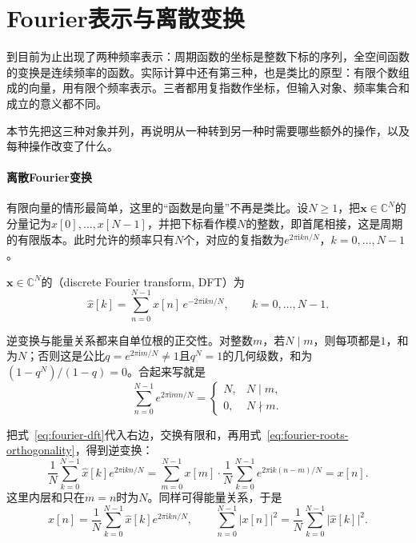 \section{Fourier表示与离散变换}
\label{sec:fourier-discrete}

到目前为止出现了两种频率表示：周期函数的坐标是整数下标的序列，全空间函数的变换是连续频率的函数。实际计算中还有第三种，也是类比的原型：有限个数组成的向量，用有限个频率表示。三者都用复指数作坐标，但输入对象、频率集合和成立的意义都不同。

本节先把这三种对象并列，再说明从一种转到另一种时需要哪些额外的操作，以及每种操作改变了什么。

\paragraph{离散Fourier变换}

有限向量的情形最简单，这里的“函数是向量”不再是类比。设$N\geq1$，把$\bm x\in\mathbb C^N$的分量记为$x[0],\ldots,x[N-1]$，并把下标看作模$N$的整数，即首尾相接，这是周期的有限版本。此时允许的频率只有$N$个，对应的复指数为$e^{2\pi\mathrm ikn/N}$，$k=0,\ldots,N-1$。

\begin{definition}[离散Fourier变换]
\label{def:fourier-dft}
$\bm x\in\mathbb C^N$的（discrete Fourier transform, DFT）为
\begin{equation}
\widehat x[k]=\sum_{n=0}^{N-1}x[n]\,e^{-2\pi\mathrm ikn/N},\qquad k=0,\ldots,N-1 .
\label{eq:fourier-dft}
\end{equation}
\end{definition}

逆变换与能量关系都来自单位根的正交性。对整数$m$，若$N\mid m$，则每项都是$1$，和为$N$；否则这是公比$q=e^{2\pi\mathrm im/N}\neq1$且$q^N=1$的几何级数，和为$(1-q^N)/(1-q)=0$。合起来写就是
\begin{equation}
\sum_{n=0}^{N-1}e^{2\pi\mathrm imn/N}=\begin{cases}N,&N\mid m,\\0,&N\nmid m.\end{cases}
\label{eq:fourier-roots-orthogonality}
\end{equation}

把式~\eqref{eq:fourier-dft}代入右边，交换有限和，再用式~\eqref{eq:fourier-roots-orthogonality}，得到逆变换：
\[
\frac1N\sum_{k=0}^{N-1}\widehat x[k]e^{2\pi\mathrm ikn/N}
=\sum_{m=0}^{N-1}x[m]\cdot\frac1N\sum_{k=0}^{N-1}e^{2\pi\mathrm ik(n-m)/N}=x[n].
\]
这里内层和只在$m=n$时为$N$。同样可得能量关系，于是
\begin{equation}
x[n]=\frac1N\sum_{k=0}^{N-1}\widehat x[k]e^{2\pi\mathrm ikn/N},\qquad
\sum_{n=0}^{N-1}\lvert x[n]\rvert^2=\frac1N\sum_{k=0}^{N-1}\lvert\widehat x[k]\rvert^2 .
\label{eq:fourier-dft-inverse}
\end{equation}

